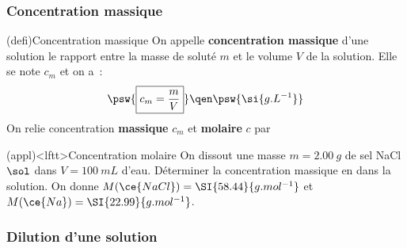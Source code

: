 \documentclass[../../main/main.tex]{subfiles}
\begin{document}
\subsubsection{Concentration massique}

\begin{tcb*}[label=def:cmol, sidebyside](defi){Concentration massique}
	On appelle \textbf{concentration massique} d'une solution le
	rapport entre la masse de soluté $m$ et le volume $V$ de
	la solution. Elle se note $c_m$ et on a~:
	\[
		\psw{%
			\boxed{c_m = \frac{m}{V}}
		}%
		\qen
		\psw{%
			\si{g.L^{-1}}
		}%
	\]
	\vspace{-15pt}
	\tcblower
	On relie concentration \textbf{massique} $c_m$ et \textbf{molaire} $c$ par
	\psw{%
		\[ \boxed{c_m = cM}\]
	}%
	\vspace{-15pt}
\end{tcb*}

\begin{tcb}[label=exem:cmol](appl)<lftt>{Concentration molaire}
	On dissout une masse $m = \SI{2.00}{g}$ de sel NaCl$\sol$ dans
	$V = \SI{100}{mL}$ d'eau.
	\smallbreak
	Déterminer la concentration massique en  dans la solution.
	\smallbreak
	On donne
	$M(\ce{NaCl}) = \SI{58.44}{g.mol^{-1}}$ et
	$M(\ce{Na}) = \SI{22.99}{g.mol^{-1}}$.
	\tcblower
	\vspace{-15pt}
\end{tcb}

\subsubsection{Dilution d'une solution}
\end{document}
